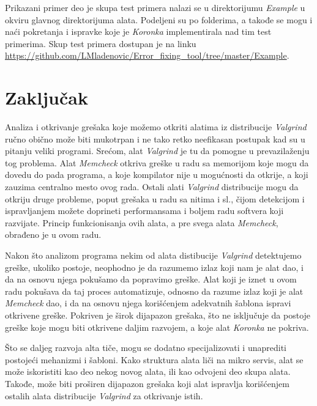 \documentclass[12pt,oneside]{memoir}
\theoremstyle{plain}
\theoremstyle{definition}
\begin{document}
Prikazani primer deo je skupa test primera nalazi se u direktorijumu \textit{Example} u okviru glavnog direktorijuma alata. Podeljeni su po folderima, a takođe se mogu i naći pokretanja i ispravke koje je \textit{Koronka} implementirala nad tim test primerima. Skup test primera dostupan je na linku \url{https://github.com/LMladenovic/Error_fixing_tool/tree/master/Example}. 


\chapter{Zaključak}
Analiza i otkrivanje grešaka koje možemo otkriti alatima iz distribucije \textit{Valgrind} ručno obično može biti mukotrpan i ne tako retko neefikasan postupak kad su u pitanju veliki programi. Srećom, alat \textit{Valgrind} je tu da pomogne u prevazilaženju tog problema. Alat \textit{Memcheck} otkriva greške u radu sa memorijom koje mogu da dovedu do pada programa, a koje kompilator nije u mogućnosti da otkrije, a koji zauzima centralno mesto ovog rada. Ostali alati \textit{Valgrind} distribucije mogu da otkriju druge probleme, poput grešaka u radu sa nitima i sl., čijom detekcijom i ispravljanjem možete doprineti performansama i boljem radu softvera koji razvijate. Princip funkcionisanja ovih alata, a pre svega alata \textit{Memcheck}, obrađeno je u ovom radu. 

Nakon što analizom programa nekim od alata distibucije \textit{Valgrind} detektujemo greške, ukoliko postoje, neophodno je da razumemo izlaz koji nam je alat dao, i da na osnovu njega pokušamo da popravimo greške. Alat koji je iznet u ovom radu pokušava da taj proces automatizuje, odnosno da razume izlaz koji je alat \textit{Memcheck} dao, i da na osnovu njega korišćenjem adekvatnih šablona ispravi otkrivene greške. Pokriven je širok dijapazon grešaka, što ne isključuje da postoje greške koje mogu biti otkrivene daljim razvojem, a koje alat \textit{Koronka} ne pokriva. 

Što se daljeg razvoja alta tiče, mogu se dodatno specijalizovati i unaprediti postojeći mehanizmi i šabloni. Kako struktura alata liči na mikro servis, alat se može iskoristiti kao deo nekog novog alata, ili kao odvojeni deo skupa alata. Takođe, može biti proširen dijapazon grešaka koji alat ispravlja korišćenjem ostalih alata distribucije \textit{Valgrind} za otkrivanje istih. 
\end{document}
